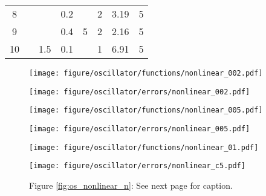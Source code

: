 \documentclass[11pt]{article}
\begin{document}
\begin{table}
\begin{center}
\begin{threeparttable}[t]
\begin{tabular}{|c|c|c|c|c|c|c|c|}
8        &                                            &                    & 0.2                                                 & \multirow{3}{*}{5}  & 2 & 3.19 & 5\\ \cline{1-1} \cline{4-4} \cline{6-8} 
9        &                                            &                    & 0.4                                                 &                      & 2  & 2.16 & 5\\ \cline{1-1} \cline{3-4} \cline{6-8} 
10       &                                            & 1.5                & 0.1                                                &                     & 1  & 6.91 & 5\\ \hline
\end{tabular}
\end{threeparttable}
\label{table:2d}
\end{center}
\end{table}


\begin{figure}
\centering
\begin{minipage}[b]{0.45\linewidth}
\texttt{[image: figure/oscillator/functions/nonlinear\_002.pdf]}
\end{minipage}
\begin{minipage}[b]{0.47\linewidth}
\texttt{[image: figure/oscillator/errors/nonlinear\_002.pdf]}
\end{minipage}
\begin{minipage}[b]{0.45\linewidth}
\texttt{[image: figure/oscillator/functions/nonlinear\_005.pdf]}
\end{minipage}
\begin{minipage}[b]{0.47\linewidth}
\texttt{[image: figure/oscillator/errors/nonlinear\_005.pdf]}
\end{minipage}
\begin{minipage}[b]{0.45\linewidth}
\texttt{[image: figure/oscillator/functions/nonlinear\_01.pdf]}
\end{minipage}
\begin{minipage}[b]{0.47\linewidth}
\texttt{[image: figure/oscillator/errors/nonlinear\_c5.pdf]}
\end{minipage}
\caption*{Figure \ref{fig:os_nonlinear_n}: See next page for caption.}
\end{figure}
\end{document}
